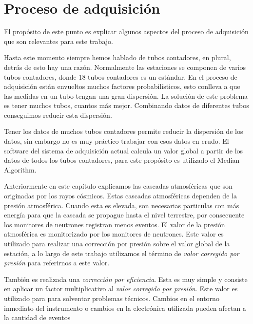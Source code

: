     \section{Proceso de adquisición}
        El propósito de este punto es explicar algunos aspectos del proceso de
        adquisición que son relevantes para este trabajo.
        \par
        Hasta este momento siempre hemos hablado de tubos contadores, en plural,
        detrás de esto hay una razón. Normalmente las estaciones se componen de
        varios tubos contadores, donde 18 tubos contadores es un estándar. En el
        proceso de adquisición están envueltos muchos factores probabilísticos,
        esto conlleva a que las medidas en un tubo tengan una gran dispersión. La
        solución de este problema es tener muchos tubos, cuantos más mejor.
        Combinando datos de diferentes tubos conseguimos reducir esta dispersión. 
        \par
        Tener los datos de muchos tubos contadores permite reducir la dispersión de
        los datos, sin embargo no es muy práctico trabajar con esos datos en crudo.
        El software del sistema de adquisición actual calcula un valor global a
        partir de los datos de todos los tubos contadores, para este propósito es
        utilizado el Median Algorithm\cite{MedianAlgr}.
        \par
        Anteriormente en este capítulo explicamos las cascadas atmosféricas que son
        originadas por los rayos cósmicos. Estas cascadas atmosféricas dependen de
        la presión atmosférica. Cuando esta es elevada, son necesarias particulas
        con más energía para que la cascada se propague hasta el nivel terrestre,
        por consecuente los monitores de neutrones registran menos eventos. El
        valor de la presión atmosférica es monitorizado por los monitores de
        neutrones. Este valor es utilizado para realizar una corrección por presión
        sobre el valor global de la estación, a lo largo de este trabajo utilizamos
        el término de \emph{valor corregido por presión} para referirnos a este
        valor.
        \par
        También es realizada una \emph{corrección por eficiencia}. Esta es muy
        simple y consiste en aplicar un factor multiplicativo al \emph{valor
        corregido por presión}. Este valor es utilizado para para solventar
        problemas técnicos. Cambios en el entorno inmediato del instrumento o
        cambios en la electrónica utilizada pueden afectan a la cantidad de eventos
